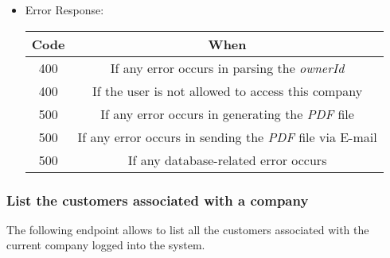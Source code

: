 \begin{itemize}
    \item Error Response:
    \begin{table}[!h]
    \centering 
    \begin{tabular}{|c|c|}
    \hline
    \multicolumn{1}{|c|}{\textbf{Code}} & \multicolumn{1}{c|}{\textbf{When}} \\ \hline
    400 & If any error occurs in parsing the \textit{ownerId}  \\\hline
    400 & If the user is not allowed to access this company \\\hline
    500 & If any error occurs in generating the \textit{PDF} file \\\hline
    500 & If any error occurs in sending the \textit{PDF} file via E-mail\\\hline
    500 & If any database-related error occurs \\\hline
    \end{tabular} 
    \end{table} 
    
\end{itemize}



\newpage
\subsubsection*{List the customers associated with a company}

The following endpoint allows to list all the customers associated with the current company logged into the system.

